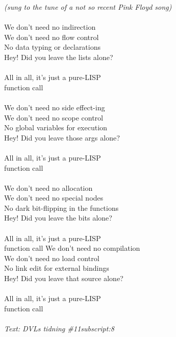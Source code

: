 {\footnotesize\textit{(sung to the tune of a not so recent Pink Floyd song)}}\\
\\
We don't need no indirection\\
We don't need no flow control\\
No data typing or declarations\\
Hey! Did you leave the lists alone?\\
\\
All in all, it's just a pure-LISP\\
function call\\
\\
We don't need no side effect-ing\\
We don't need no scope control\\
No global variables for execution\\
Hey! Did you leave those args alone?\\
\\
All in all, it's just a pure-LISP\\
function call\\
\\
We don't need no allocation\\
We don't need no special nodes\\
No dark bit-flipping in the functions\\
Hey! Did you leave the bits alone?\\
\\
All in all, it's just a pure-LISP\\
function call
\newpage
We don't need no compilation\\
We don't need no load control\\
No link edit for external bindings\\
Hey! Did you leave that source alone?\\
\\
All in all, it's just a pure-LISP\\
function call\\
\\
{\footnotesize\textit{Text: DVLs tidning \#11subscript:8}}
